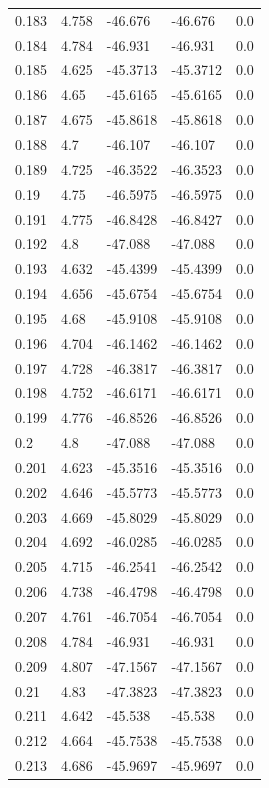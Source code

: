 \begin{table}[H]
\begin{tabular}{lllll}
0.183 & 4.758 & -46.676 & -46.676 & 0.0 \\
0.184 & 4.784 & -46.931 & -46.931 & 0.0 \\
0.185 & 4.625 & -45.3713 & -45.3712 & 0.0 \\
0.186 & 4.65 & -45.6165 & -45.6165 & 0.0 \\
0.187 & 4.675 & -45.8618 & -45.8618 & 0.0 \\
0.188 & 4.7 & -46.107 & -46.107 & 0.0 \\
0.189 & 4.725 & -46.3522 & -46.3523 & 0.0 \\
0.19 & 4.75 & -46.5975 & -46.5975 & 0.0 \\
0.191 & 4.775 & -46.8428 & -46.8427 & 0.0 \\
0.192 & 4.8 & -47.088 & -47.088 & 0.0 \\
0.193 & 4.632 & -45.4399 & -45.4399 & 0.0 \\
0.194 & 4.656 & -45.6754 & -45.6754 & 0.0 \\
0.195 & 4.68 & -45.9108 & -45.9108 & 0.0 \\
0.196 & 4.704 & -46.1462 & -46.1462 & 0.0 \\
0.197 & 4.728 & -46.3817 & -46.3817 & 0.0 \\
0.198 & 4.752 & -46.6171 & -46.6171 & 0.0 \\
0.199 & 4.776 & -46.8526 & -46.8526 & 0.0 \\
0.2 & 4.8 & -47.088 & -47.088 & 0.0 \\
0.201 & 4.623 & -45.3516 & -45.3516 & 0.0 \\
0.202 & 4.646 & -45.5773 & -45.5773 & 0.0 \\
0.203 & 4.669 & -45.8029 & -45.8029 & 0.0 \\
0.204 & 4.692 & -46.0285 & -46.0285 & 0.0 \\
0.205 & 4.715 & -46.2541 & -46.2542 & 0.0 \\
0.206 & 4.738 & -46.4798 & -46.4798 & 0.0 \\
0.207 & 4.761 & -46.7054 & -46.7054 & 0.0 \\
0.208 & 4.784 & -46.931 & -46.931 & 0.0 \\
0.209 & 4.807 & -47.1567 & -47.1567 & 0.0 \\
0.21 & 4.83 & -47.3823 & -47.3823 & 0.0 \\
0.211 & 4.642 & -45.538 & -45.538 & 0.0 \\
0.212 & 4.664 & -45.7538 & -45.7538 & 0.0 \\
0.213 & 4.686 & -45.9697 & -45.9697 & 0.0 \\

\end{tabular}
\end{table}
